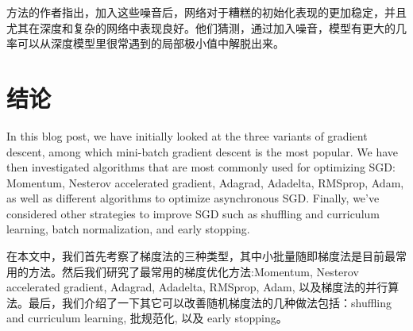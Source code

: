 \documentclass{article}
\begin{document}
方法的作者指出，加入这些噪音后，网络对于糟糕的初始化表现的更加稳定，并且尤其在深度和复杂的网络中表现良好。他们猜测，通过加入噪音，模型有更大的几率可以从深度模型里很常遇到的局部极小值中解脱出来。

\section{结论}

In this blog post, we have initially looked at the three variants of gradient descent, among which mini-batch gradient descent is the most popular. We have then investigated algorithms that are most commonly used for optimizing SGD: Momentum, Nesterov accelerated gradient, Adagrad, Adadelta, RMSprop, Adam, as well as different algorithms to optimize asynchronous SGD. Finally, we've considered other strategies to improve SGD such as shuffling and curriculum learning, batch normalization, and early stopping.

在本文中，我们首先考察了梯度法的三种类型，其中小批量随即梯度法是目前最常用的方法。然后我们研究了最常用的梯度优化方法:Momentum, Nesterov accelerated gradient, Adagrad, Adadelta, RMSprop, Adam, 以及梯度法的并行算法。最后，我们介绍了一下其它可以改善随机梯度法的几种做法包括：shuffling and curriculum learning, 批规范化, 以及 early stopping。



\end{document}

